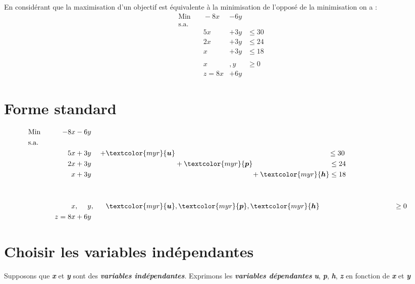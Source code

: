 \documentclass{report}
\begin{document}
\begin{multicols*}{2}
En considérant que la maximisation d'un objectif est 
équivalente à la minimisation de l'opposé de la minimisation on a :
\begin{alignat*}{4}
    &\text{Min} &\quad -8x & - 6y & \\
    &\text{s.a.} && & \\
    &\phantom{\text{Min}} &\quad 5x & + 3y &\leq 30 & \\
    &\phantom{\text{Min}} &\quad 2x & + 3y &\leq 24 & \\
    &\phantom{\text{Min}} &\quad x & + 3y &\leq 18 & \\ \\
    &\phantom{\text{Min}} &\quad x &,y& \geq 0 & \\
    & \phantom{\text{Min}} &\quad z = 8x & + 6y &
\end{alignat*}

\section{Forme standard}
\begin{alignat*}{4}
    &\text{Min} &\quad -8x & - 6y &\\
    &\text{s.a.} \\
    &\phantom{\text{Min}} &\quad 5x & + 3y & 
    + \textcolor{myr}{\boldsymbol{ u}}& 
    \phantom{+ \; \textcolor{myr}{\boldsymbol{ p}}} 
    \phantom{+ \;\textcolor{myr}{\boldsymbol{ h}}} \leq 30 & 
    \\
    &\phantom{\text{Min}} &\quad 2x & + 3y & 
    \phantom{+\textcolor{myr}{\boldsymbol{ u}}}& + 
    \textcolor{myr}{\boldsymbol{ p}} 
    \phantom{+\;\textcolor{myr}{\boldsymbol{ h}}} 
    \leq 24 & \\
    &\phantom{\text{Min}} &\quad x & + 3y & 
    \phantom{+\textcolor{myr}{\boldsymbol{ u}}}&  
    \phantom{+\;\textcolor{myr}{\boldsymbol{ p}}} 
    +\textcolor{myr}{\boldsymbol{ h}} \leq 18 & \\ 
    \\ 
    \\
                &\phantom{\text{Min}} &\quad x &, \phantom{+3} y,& 
    \textcolor{myr}{\boldsymbol{u}}&,
    \textcolor{myr}{\boldsymbol{ p}}, 
    \textcolor{myr}{\boldsymbol{ h}}
    \phantom{+\textcolor{myr}{\boldsymbol{ p}}} \geq 0 & \\
    & \phantom{\text{Min}} &\quad z = 8x & + 6y &
\end{alignat*}



\section{Choisir les variables indépendantes}
Supposons que 
\textcolor{myb}{\textbf{\textit{x}}} et 
\textcolor{myb}{\textbf{\textit{y}}} sont des 
\textcolor{myb}{\textbf{\textit{variables indépendantes}}}. Exprimons 
les \textcolor{myr}{\textbf{\textit{variables dépendantes}}} 
\textcolor{myr}{\textbf{\textit{u}}},
\textcolor{myr}{\textbf{\textit{p}}},
\textcolor{myr}{\textbf{\textit{h}}},
\textcolor{myr}{\textbf{\textit{z}}} en fonction de 
\textcolor{myb}{\textbf{\textit{x}}} et \textcolor{myb}{\textbf{\textit{y}}}



\end{multicols*}
\end{document}
